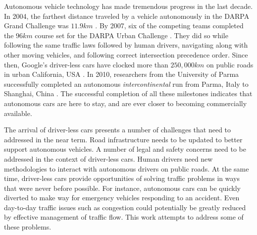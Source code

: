 \documentclass[letterpaper, 10 pt, conference]{ieeeconf}  %
\begin{document}

Autonomous vehicle technology has made tremendous progress in the last decade. In 2004, the farthest distance traveled by a vehicle autonomously in the DARPA Grand Challenge was $11.9km$ \cite{cnnGrandChallenge2004}. By 2007, six of the competing teams completed the $96km$ course set for the DARPA Urban Challenge \cite{spectrumUrbanChallenge2007}. They did so while following the same traffic laws followed by human drivers, navigating along with other moving vehicles, and following correct intersection precedence order. Since then, Google's driver-less cars have clocked more than $250,000km$ on public roads in urban California, USA \cite{tedThrun2011}. In 2010, researchers from the University of Parma successfully completed an autonomous \textit{intercontinental} run from Parma, Italy to Shanghai, China \cite{cnnVislab2010}. The successful completion of all these milestones indicates that autonomous cars are here to stay, and are ever closer to becoming commercially available. 

The arrival of driver-less cars presents a number of challenges that need to addressed in the near term. Road infrastructure needs to be updated to better support autonomous vehicles. A number of legal and safety concerns need to be addressed in the context of driver-less cars. Human drivers need new methodologies to interact with autonomous drivers on public roads. At the same time, driver-less cars provide opportunities of solving traffic problems in ways that were never before possible. For instance, autonomous cars can be quickly diverted to make way for emergency vehicles responding to an accident. Even day-to-day traffic issues such as congestion could potentially be greatly reduced by effective management of traffic flow. This work attempts to address some of these problems.



\end{document}
